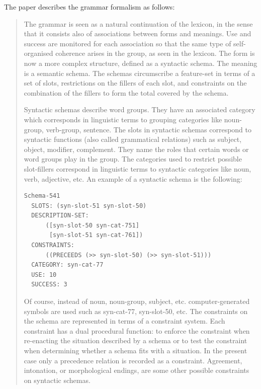 The paper describes the grammar formalism as follows:

\begin{quote}
The grammar is seen as a natural continuation of the lexicon, in the sense that it consists also of associations between forms and meanings. Use and success are monitored for each association so that the same type of self-organised coherence arises in the group, as seen in the lexicon. The form is now a more complex structure, defined as a syntactic schema. The meaning is a semantic schema. The schemas
circumscribe a feature-set in terms of a set of slots, restrictions	
on the fillers of each slot, and constraints on the combination	
of the fillers to form the total covered by the schema. 

Syntactic schemas describe word groups. They have an associated category which corresponds in linguistic terms to grouping categories like noun-group, verb-group, sentence. The slots in syntactic schemas correspond to syntactic functions (also called grammatical relations) such as subject, object, modifier, complement. They name the roles that certain words or word groups play in the group. The categories used to restrict possible slot-fillers correspond in linguistic terms to syntactic categories like noun, verb, adjective, etc. An example of a syntactic schema is the following:
\begin{verbatim}
Schema-541 
  SLOTS: (syn-slot-51 syn-slot-50) 
  DESCRIPTION-SET: 
      ([syn-slot-50 syn-cat-751] 
       [syn-slot-51 syn-cat-761])
  CONSTRAINTS:
      ((PRECEEDS (>> syn-slot-50) (>> syn-slot-51)))
  CATEGORY: syn-cat-77 
  USE: 10 
  SUCCESS: 3
\end{verbatim}
Of course, instead of noun, noun-group, subject, etc. computer-generated symbols are used such 
as syn-cat-77, syn-slot-50, etc. The constraints on the schema are represented in terms of
a constraint system. Each constraint
has a dual procedural function: to enforce the constraint when re-enacting the situation
described by a schema or to test the constraint when determining whether a schema fits with a situation. In the present
case only a precedence relation is recorded as a constraint. Agreement, intonation, or morphological
endings, are some other possible constraints on syntactic schemas.


\end{quote}
